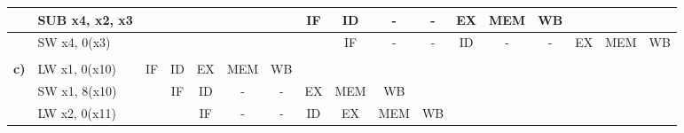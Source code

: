 \documentclass{article}
\begin{document}
\begin{table}[h]
{\begin{tabular}{|l|l|l|l|c|c|c|c|c|c|l|l|l|l|l|l|l|}
                                             & SUB x4, x2, x3        &                         &                         & \multicolumn{1}{l|}{} &                       &                       & IF                    & ID                    & -                     & \multicolumn{1}{c|}{-}  & \multicolumn{1}{c|}{EX}  & \multicolumn{1}{c|}{MEM} & \multicolumn{1}{c|}{WB}  &                         &                          &                         \\ \hline
                                             & SW  x4, 0(x3)         &                         &                         & \multicolumn{1}{l|}{} &                       &                       &                       & IF                    & -                     & \multicolumn{1}{c|}{-}  & \multicolumn{1}{c|}{ID}  & \multicolumn{1}{c|}{-}   & \multicolumn{1}{c|}{-}   & \multicolumn{1}{c|}{EX} & \multicolumn{1}{c|}{MEM} & \multicolumn{1}{c|}{WB} \\ \hline
                                             &                       &                         &                         & \multicolumn{1}{l|}{} & \multicolumn{1}{l|}{} & \multicolumn{1}{l|}{} & \multicolumn{1}{l|}{} & \multicolumn{1}{l|}{} & \multicolumn{1}{l|}{} &                         &                          &                          &                          &                         &                          &                         \\ \hline
    \textbf{c)}                              & LW  x1, 0(x10)        & \multicolumn{1}{c|}{IF} & \multicolumn{1}{c|}{ID} & EX                    & MEM                   & WB                    & \multicolumn{1}{l|}{} & \multicolumn{1}{l|}{} & \multicolumn{1}{l|}{} &                         &                          &                          &                          &                         &                          &                         \\ \hline
                                             & SW  x1, 8(x10)        &                         & \multicolumn{1}{c|}{IF} & ID                    & -                     & -                     & EX                    & MEM                   & WB                    &                         &                          &                          &                          &                         &                          &                         \\ \hline
                                             & LW  x2, 0(x11)        &                         &                         & IF                    & -                     & -                     & ID                    & EX                    & MEM                   & \multicolumn{1}{c|}{WB} &                          &                          &                          &                         &                          &                         \\ \hline

\end{tabular}}
\end{table}
\end{document}
